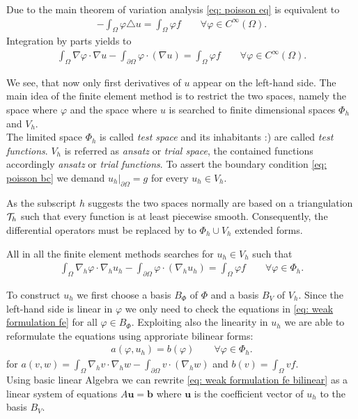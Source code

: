 Due to the main theorem of variation analysis \eqref{eq: poisson eq} is equivalent to 
\begin{align}
	-\int_\Omega \varphi \triangle u = \int_\Omega \varphi f \qquad \forall \varphi \in C^\infty(\Omega).
\end{align}
Integration by parts yields to
\begin{align}
	\int_\Omega \nabla \varphi  \cdot \nabla u -\int_{\partial \Omega} \varphi  \cdot (\nabla u)  = \int_\Omega \varphi f \qquad \forall \varphi \in C^\infty(\Omega).
\end{align}

We see, that now only first derivatives of $u$ appear on the left-hand side.   
The main idea of the finite element method is to restrict the two spaces, namely the space where $\varphi$ and the space where $u$ is searched  to finite dimensional spaces $\Phi_h$ and $V_h$.\\
The limited space $\Phi_h$ is called \emph{test space} and its inhabitants :) are called \emph{test functions}. $V_h$ is referred as \emph{ansatz} or \emph{trial space},  the contained functions accordingly \emph{ansatz} or \emph{trial functions}. To assert the boundary condition \eqref{eq: poisson bc} we demand $u_h|_{\partial \Omega} = g$ for every $u_h \in V_h$.

As the subscript $h$ suggests the two spaces normally are based on a triangulation $\mathcal{T}_h$ such that every function is at least piecewise smooth. Consequently, the differential operators must be replaced by to $\Phi_h \cup V_h$ extended forms.

All in all the finite element methods searches for $u_h \in V_h$ such that 
\begin{align}
	\int_\Omega \nabla_h \varphi  \cdot \nabla_h u_h -\int_{\partial \Omega} \varphi  \cdot (\nabla_h u_h)  = \int_\Omega \varphi f \qquad \forall \varphi \in \Phi_h. \label{eq: weak formulation fe}
\end{align}

To construct $u_h$ we first choose a basis $B_{\Phi}$ of $\Phi$ and a basis $B_V$ of $V_h$.
Since the left-hand side is linear in $\varphi$ we only need to check the equations in \eqref{eq: weak formulation fe} for all $\varphi \in B_{\Phi}$. Exploiting also the linearity in $u_h$  we are able to reformulate the equations using approriate bilinear forms:
\begin{align}
	a(\varphi,u_h)  =b(\varphi) \qquad \forall \varphi \in \Phi_h. \label{eq: weak formulation fe bilinear}
\end{align}
for $a(v,w)= \int_\Omega \nabla_h v  \cdot \nabla_h w -\int_{\partial \Omega} v  \cdot (\nabla_h w)$ and $b(v) = \int_\Omega v f$.\\
Using basic linear Algebra we can rewrite \eqref{eq: weak formulation fe bilinear} as a linear system of equations $A \mathbf{u} = \mathbf{b}$ where  $\mathbf{u}$ is the coefficient vector of $u_h$ to the basis $B_V$.  

